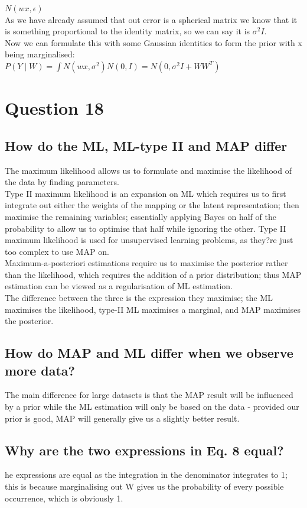 \documentclass[a4paper, 9pt]{article}
\begin{document}
\( N (wx, \epsilon) \) \\

As we have already assumed that out error is a spherical matrix we know that it is something proportional to the identity matrix, so we can say it is \( \sigma^2 I \). \\
Now we can formulate this with some Gaussian identities to form the prior with x being marginalised: \\

\( P(Y \mid W) = \int N(wx, \sigma^2) N(0, I) = N(0, \sigma^2 I + WW^T) \) 

\section*{Question 18}
\subsection*{How do the ML, ML-type II and MAP differ}
The maximum likelihood allows us to formulate and maximise the likelihood of the data by finding parameters. \\
Type II maximum likelihood is an expansion on ML which requires us to first integrate out either the weights of the mapping or the latent representation; then maximise the remaining variables; essentially applying Bayes on half of the probability to allow us to optimise that half while ignoring the other. Type II maximum likelihood is used for unsupervised learning problems, as they?re just too complex to use MAP on. \\
Maximum-a-posteriori estimations require us to maximise the posterior rather than the likelihood, which requires the addition of a prior distribution; thus MAP estimation can be viewed as a regularisation of ML estimation. \\
The difference between the three is the expression they maximise; the ML maximises the likelihood, type-II ML maximises a marginal, and MAP maximises the posterior. 
\subsection*{How do MAP and ML differ when we observe more data?}
The main difference for large datasets is that the MAP result will be influenced by a prior while the ML estimation will only be based on the data - provided our prior is good, MAP will generally give us a slightly better result. 
\subsection*{Why are the two expressions in Eq. 8 equal?}
he expressions are equal as the integration in the denominator integrates to 1; this is because marginalising out W gives us the probability of every possible occurrence, which is obviously 1.
\end{document}
